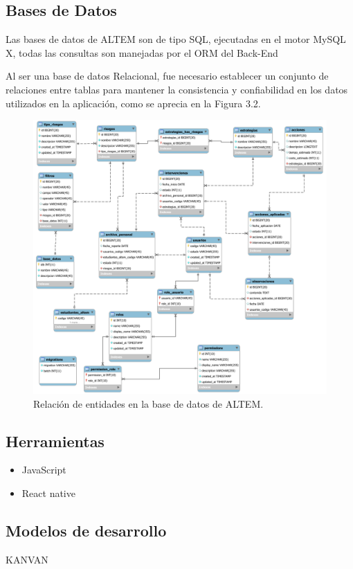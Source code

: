 \subsection{Bases de Datos}
Las bases de datos de ALTEM son de tipo SQL, ejecutadas en el motor MySQL X, todas las consultas son manejadas por el ORM del Back-End

Al ser una base de datos Relacional, fue necesario establecer un conjunto de relaciones entre tablas para mantener la consistencia y confiabilidad en los datos utilizados en la aplicación, como se aprecia en la Figura 3.2.

\begin{figure}[H]
    \centering
    \includegraphics[width=1\textwidth]{img/EER.png}
    \caption{Relación de entidades en la base de datos de ALTEM.}
\end{figure}

\subsection{Herramientas}
    \begin{itemize}
         \item JavaScript
         \item React native
    \end{itemize}
 \subsection{Modelos de desarrollo}
     KANVAN

